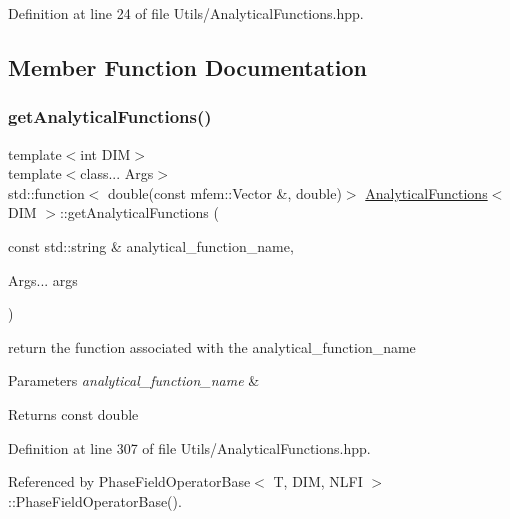 Definition at line 24 of file Utils/\+Analytical\+Functions.\+hpp.



\subsection{Member Function Documentation}
\mbox{\label{classAnalyticalFunctions_a88a27c868b872e12d16f1097779fd3f8}} 
\subsubsection{\texorpdfstring{get\+Analytical\+Functions()}{getAnalyticalFunctions()}}
{\footnotesize\ttfamily template$<$int D\+IM$>$ \\
template$<$class... Args$>$ \\
std\+::function$<$ double(const mfem\+::\+Vector \&, double)$>$ \hyperlink{classAnalyticalFunctions}{Analytical\+Functions}$<$ D\+IM $>$\+::get\+Analytical\+Functions (\begin{DoxyParamCaption}\item[{const std\+::string \&}]{analytical\+\_\+function\+\_\+name,  }\item[{Args...}]{args }\end{DoxyParamCaption})}



return the function associated with the analytical\+\_\+function\+\_\+name 


\begin{DoxyParams}{Parameters}
{\em analytical\+\_\+function\+\_\+name} & \\
\hline
\end{DoxyParams}
\begin{DoxyReturn}{Returns}
const double 
\end{DoxyReturn}


Definition at line 307 of file Utils/\+Analytical\+Functions.\+hpp.



Referenced by Phase\+Field\+Operator\+Base$<$ T, D\+I\+M, N\+L\+F\+I $>$\+::\+Phase\+Field\+Operator\+Base().


